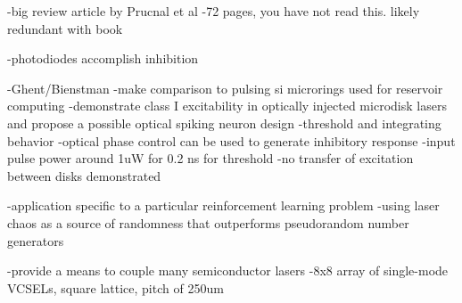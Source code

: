 \cite{krro2011}

\cite{prsh2016}
-big review article by Prucnal et al
-72 pages, you have not read this. likely redundant with book

\cite{nash2013}

\cite{shna2015}
-photodiodes accomplish inhibition

\cite{shna2016}

\cite{huja2015}

\cite{alva2013}
-Ghent/Bienstman
-make comparison to pulsing si microrings used for reservoir computing
-demonstrate class I excitability in optically injected microdisk lasers and propose a possible optical spiking neuron design
-threshold and integrating behavior
-optical phase control can be used to generate inhibitory response
-input pulse power around 1uW for 0.2 ns for threshold
-no transfer of excitation between disks demonstrated

\cite{huhe2010}

\cite{coge2011}

\vspace{3em}
\cite{nate2017}
-application specific to a particular reinforcement learning problem
-using laser chaos as a source of randomness that outperforms pseudorandom number generators

\cite{brfi2015}
-provide a means to couple many semiconductor lasers
-8x8 array of single-mode VCSELs, square lattice, pitch of 250um


